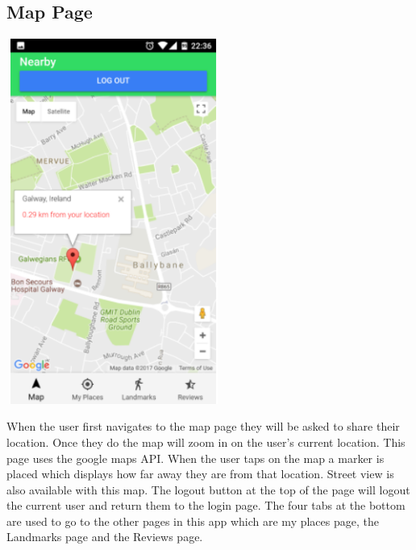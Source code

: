 \subsection{Map Page}
\begin{center}    
	\includegraphics[width=7cm, height=12cm]{img/mappage.png}
\end{center}
When the user first navigates to the map page they will be asked to share their location. Once they do the map will zoom in on the user's current location. This page uses the google maps API. When the user taps on the map a marker is placed which displays how far away they are from that location. Street view is also available with this map. The logout button at the top of the page will logout the current user and return them to the login page. The four tabs at the bottom are used to go to the other pages in this app which are my places page, the Landmarks page and the Reviews page.

